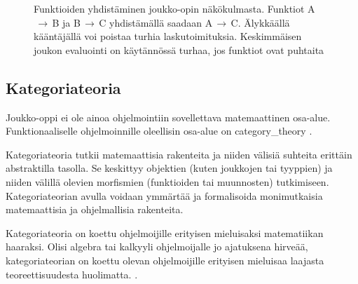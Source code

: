\begin{figure}[htbp]
    \vspace{10pt}
    \caption{Funktioiden yhdistäminen joukko-opin näkökulmasta. Funktiot A$\,\to\,$B ja B$\,\to\,$C yhdistämällä saadaan A$\,\to\,$C. Älykkäällä kääntäjällä voi poistaa turhia laskutoimituksia. Keskimmäisen joukon evaluointi on käytännössä turhaa, jos funktiot ovat puhtaita}
    \label{fig:function_composition_in_sets}
\end{figure}


\subsection{Kategoriateoria}


Joukko-oppi ei ole ainoa ohjelmointiin sovellettava matemaattinen osa-alue. Funktionaaliselle ohjelmoinnille oleellisin osa-alue on \gls{category_theory} \cite{bartosz_category_for_progamers,promises-spec-94,dear_functional_bros}.

Kategoriateoria tutkii matemaattisia rakenteita ja niiden välisiä suhteita erittäin abstraktilla tasolla. Se keskittyy objektien (kuten joukkojen tai tyyppien) ja niiden välillä olevien morfismien (funktioiden tai muunnosten) tutkimiseen. Kategoriateorian avulla voidaan ymmärtää ja formalisoida monimutkaisia matemaattisia ja ohjelmallisia rakenteita. \citep{bartosz_category_for_progamers,promises-spec-94,category_theory}

Kategoriateoria on koettu ohjelmoijille erityisen mieluisaksi matematiikan haaraksi. Olisi algebra tai kalkyyli ohjelmoijalle jo ajatuksena hirveää, kategoriateorian on koettu olevan ohjelmoijille erityisen mieluisaa laajasta teoreettisuudesta huolimatta. \cite[9]{milewski2017category}.

